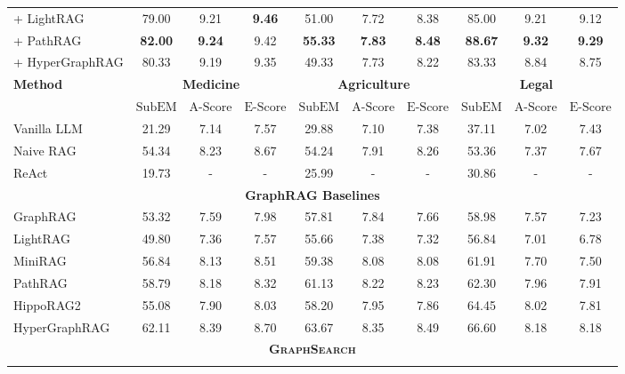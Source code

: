 \begin{table}[t]
\begin{center}
\begin{tabular}{lccccccccc}
\midrule
\rowcolor{gray!20}
+ LightRAG       & 79.00 & 9.21 & \textbf{9.46} & 51.00 & 7.72 & 8.38 & 85.00 & 9.21 & 9.12 \\
\rowcolor{gray!20}
+ PathRAG        & \textbf{82.00} & \textbf{9.24} & 9.42 & \textbf{55.33} & \textbf{7.83} & \textbf{8.48} & \textbf{88.67} & \textbf{9.32} & \textbf{9.29} \\
\rowcolor{gray!20}
+ HyperGraphRAG  & 80.33 & 9.19 & 9.35 & 49.33 & 7.73 & 8.22 & 83.33 & 8.84 & 8.75 \\
\bottomrule
\toprule
\multirow{2}{*}{\normalsize\textbf{Method}}
& \multicolumn{3}{c}{\textbf{Medicine}}
& \multicolumn{3}{c}{\textbf{Agriculture}}
& \multicolumn{3}{c}{\textbf{Legal}} \\
\cmidrule[1pt](lr){2-4} \cmidrule[1pt](lr){5-7} \cmidrule[1pt](lr){8-10}
& {\scriptsize $\mathrm{SubEM}$} & {\scriptsize $\mathrm{A\text{-}Score}$} & {\scriptsize $\mathrm{E\text{-}Score}$}
& {\scriptsize $\mathrm{SubEM}$} & {\scriptsize $\mathrm{A\text{-}Score}$} & {\scriptsize $\mathrm{E\text{-}Score}$}
& {\scriptsize $\mathrm{SubEM}$} & {\scriptsize $\mathrm{A\text{-}Score}$} & {\scriptsize $\mathrm{E\text{-}Score}$} \\
\midrule
Vanilla LLM      & 21.29 & 7.14 & 7.57 & 29.88 & 7.10 & 7.38 & 37.11 & 7.02 & 7.43 \\
Naive RAG        & 54.34 & 8.23 & 8.67 & 54.24 & 7.91 & 8.26 & 53.36 & 7.37 & 7.67 \\
ReAct            & 19.73 & -    & -    & 25.99 & -    & -    & 30.86  & -    & -    \\
\midrule
\multicolumn{10}{c}{\textbf{GraphRAG Baselines}} \\
\midrule
GraphRAG         & 53.32 & 7.59 & 7.98 & 57.81 & 7.84 & 7.66 & 58.98 & 7.57 & 7.23 \\
LightRAG         & 49.80 & 7.36 & 7.57 & 55.66 & 7.38 & 7.32 & 56.84 & 7.01 & 6.78 \\
MiniRAG          & 56.84 & 8.13 & 8.51 & 59.38 & 8.08 & 8.08 & 61.91 & 7.70 & 7.50 \\
PathRAG          & 58.79 & 8.18 & 8.32 & 61.13 & 8.22 & 8.23 & 62.30 & 7.96 & 7.91 \\
HippoRAG2        & 55.08 & 7.90 & 8.03 & 58.20 & 7.95 & 7.86 & 64.45 & 8.02 & 7.81 \\
HyperGraphRAG    & 62.11 & 8.39 & 8.70 & 63.67 & 8.35 & 8.49 & 66.60 & 8.18 & 8.18 \\
\midrule
\multicolumn{10}{c}{\textbf{\textsc{GraphSearch}}} \\
\midrule
\rowcolor{gray!20}

\end{tabular}
\end{center}
\end{table}
